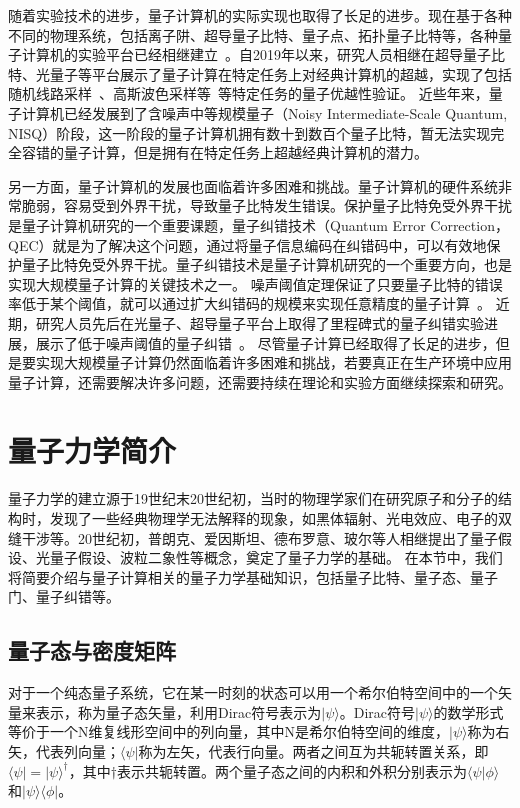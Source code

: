 随着实验技术的进步，量子计算机的实际实现也取得了长足的进步。现在基于各种不同的物理系统，包括离子阱、超导量子比特、量子点、拓扑量子比特等，各种量子计算机的实验平台已经相继建立~\cite{blatt2008quantum,devoret2013superconducting,wallraff2004strong,loss1998quantum}。自2019年以来，研究人员相继在超导量子比特、光量子等平台展示了量子计算在特定任务上对经典计算机的超越，实现了包括随机线路采样~\cite{arute2019quantum}、高斯波色采样等~\cite{zhong2020quantum}等特定任务的量子优越性验证。
近些年来，量子计算机已经发展到了含噪声中等规模量子（Noisy Intermediate-Scale Quantum, NISQ）阶段，这一阶段的量子计算机拥有数十到数百个量子比特，暂无法实现完全容错的量子计算，但是拥有在特定任务上超越经典计算机的潜力。

另一方面，量子计算机的发展也面临着许多困难和挑战。量子计算机的硬件系统非常脆弱，容易受到外界干扰，导致量子比特发生错误。保护量子比特免受外界干扰是量子计算机研究的一个重要课题，量子纠错技术（Quantum Error Correction，QEC）就是为了解决这个问题，通过将量子信息编码在纠错码中，可以有效地保护量子比特免受外界干扰。量子纠错技术是量子计算机研究的一个重要方向，也是实现大规模量子计算的关键技术之一。
噪声阈值定理保证了只要量子比特的错误率低于某个阈值，就可以通过扩大纠错码的规模来实现任意精度的量子计算~\cite{aharonov1996quantum,aliferis2009fault}。
近期，研究人员先后在光量子、超导量子平台上取得了里程碑式的量子纠错实验进展，展示了低于噪声阈值的量子纠错~\cite{reed2012realization,ofek2016extending,riste2015detecting}。
尽管量子计算已经取得了长足的进步，但是要实现大规模量子计算仍然面临着许多困难和挑战，若要真正在生产环境中应用量子计算，还需要解决许多问题，还需要持续在理论和实验方面继续探索和研究。


\section{量子力学简介}
量子力学的建立源于19世纪末20世纪初，当时的物理学家们在研究原子和分子的结构时，发现了一些经典物理学无法解释的现象，如黑体辐射、光电效应、电子的双缝干涉等。20世纪初，普朗克、爱因斯坦、德布罗意、玻尔等人相继提出了量子假设、光量子假设、波粒二象性等概念，奠定了量子力学的基础。
在本节中，我们将简要介绍与量子计算相关的量子力学基础知识，包括量子比特、量子态、量子门、量子纠错等。

\subsection{量子态与密度矩阵}

对于一个纯态量子系统，它在某一时刻的状态可以用一个希尔伯特空间中的一个矢量来表示，称为量子态矢量，利用Dirac符号表示为$|\psi\rangle$。Dirac符号$|\psi\rangle$的数学形式等价于一个N维复线形空间中的列向量，其中N是希尔伯特空间的维度，$|\psi\rangle$称为右矢，代表列向量；$\langle\psi|$称为左矢，代表行向量。两者之间互为共轭转置关系，即$\langle\psi| = |\psi\rangle^\dagger$，其中$\dagger$表示共轭转置。两个量子态之间的内积和外积分别表示为$\langle\psi|\phi\rangle$和$|\psi\rangle\langle\phi|$。

